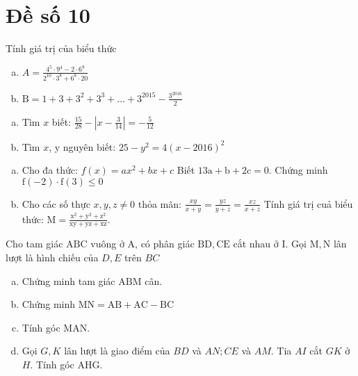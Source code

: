 \onehalfspacing
\section{Đề số 10}

\begin{bt} 
	Tính giá trị của biểu thức
	\begin{enumerate}[a.]
		\item $A=\frac{4^5 \cdot 9^4-2 \cdot 6^9}{2^{10} \cdot 3^8+6^8 \cdot 20}$
		\item $\mathrm{B}=1+3+3^2+3^3+\ldots+3^{2015}-\frac{3^{2016}}{2}$
	\end{enumerate}
	\loigiai{} 
\end{bt}

\begin{bt}
	\hfill
	\begin{enumerate}[a.]
		\item Tìm $x$ biết: $\frac{15}{28}-\left|x-\frac{3}{14}\right|=-\frac{5}{12}$
		\item Tìm $x$, y nguyên biết: $25-y^2=4(x-2016)^2$
	\end{enumerate}
	\loigiai{} 
\end{bt}

\begin{bt}
	\hfill
	\begin{enumerate}[a.]
		\item Cho đa thức: $f(x)=a x^2+b x+c$
		Biết $13 \mathrm{a}+\mathrm{b}+2 \mathrm{c}=0$. Chứng minh $\mathrm{f}(-2) \cdot \mathrm{f}(3) \leq 0$
		\item Cho các số thực $x, y, z \neq 0$ thỏa mãn: $\frac{x y}{x+y}=\frac{y z}{y+z}=\frac{x z}{x+z}$
		Tính giá trị cuả biểu thức: $\mathrm{M}=\frac{\mathrm{x}^2+\mathrm{y}^2+\mathrm{z}^2}{\mathrm{xy}+\mathrm{yz}+\mathrm{xz}}$.
	\end{enumerate}
	\loigiai{} 
\end{bt}

\begin{bt}
	Cho tam giác $\mathrm{ABC}$ vuông ở $\mathrm{A}$, có phân giác $\mathrm{BD}, \mathrm{CE}$ cắt nhau ở $\mathrm{I}$. Gọi $\mathrm{M}, \mathrm{N}$ lân lượt là hình chiếu của $D, E$ trên $B C$
	\begin{enumerate}[a.]
		\item Chứng minh tam giác $\mathrm{ABM}$ cân.
		\item Chứng minh $\mathrm{MN}=\mathrm{AB}+\mathrm{AC}-\mathrm{BC}$
		\item Tính góc MAN.
		\item Gọi $G, K$ lân lượt là giao điểm của $B D$ và $A N ; C E$ và $A M$. Tia $A I$ cắt $G K$ ở $H$. Tính góc AHG.
	\end{enumerate}
	\loigiai{}
\end{bt}
